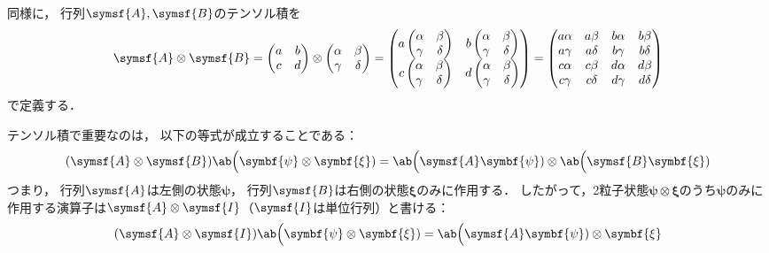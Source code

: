 \documentclass[
]{sotsu}
\newcommand{\bpsi}{\symbf{\psi}}
\newcommand{\bxi}{\symbf{\xi}}
\begin{document}
同様に，
行列$\symsf{A}, \symsf{B}$のテンソル積を
\begin{equation}
    \label{eq:tensor-product-of-2-matrix}
    \symsf{A} \otimes \symsf{B}
    =
    \begin{pmatrix}
        a  & b  \\ c  & d 
    \end{pmatrix}
    \otimes 
    \begin{pmatrix}
        \alpha & \beta \\ \gamma & \delta
    \end{pmatrix}
    =
    \begin{pmatrix}
        a
        \begin{pmatrix}
            \alpha & \beta \\ \gamma & \delta
        \end{pmatrix}
        &
        b
        \begin{pmatrix}
            \alpha & \beta \\ \gamma & \delta
        \end{pmatrix}
        \\
        c
        \begin{pmatrix}
            \alpha & \beta \\ \gamma & \delta
        \end{pmatrix}
        &
        d
        \begin{pmatrix}
            \alpha & \beta \\ \gamma & \delta
        \end{pmatrix}
    \end{pmatrix}
    =
    \begin{pmatrix}
        a \alpha  &  a \beta   &  b \alpha  &  b \beta   \\
        a \gamma  &  a \delta  &  b \gamma  &  b \delta  \\
        c \alpha  &  c \beta   &  d \alpha  &  d \beta   \\
        c \gamma  &  c \delta  &  d \gamma  &  d \delta  
    \end{pmatrix}
\end{equation}
で定義する．



\quad 
テンソル積で重要なのは，
以下の等式が成立することである：
\begin{equation}
    \label{eq:tensor-product-matrix-vector}
    (\symsf{A} \otimes \symsf{B}) \ab\Big(\bpsi \otimes \bxi)
    = \ab\Big(\symsf{A} \bpsi) \otimes \ab\Big(\symsf{B} \bxi)
\end{equation}
つまり，
行列$\symsf{A}$は左側の状態$\bpsi$，
行列$\symsf{B}$は右側の状態$\bxi$のみに作用する．
したがって，2粒子状態$\bpsi \otimes \bxi$のうち$\bpsi$のみに作用する演算子は$\symsf{A} \otimes \symsf{I}$（$\symsf{I}$は単位行列）と書ける：
\begin{equation*}
    (\symsf{A} \otimes \symsf{I}) \ab\Big(\bpsi \otimes \bxi)
    = \ab\Big(\symsf{A} \bpsi) \otimes \bxi
\end{equation*}
\end{document}
